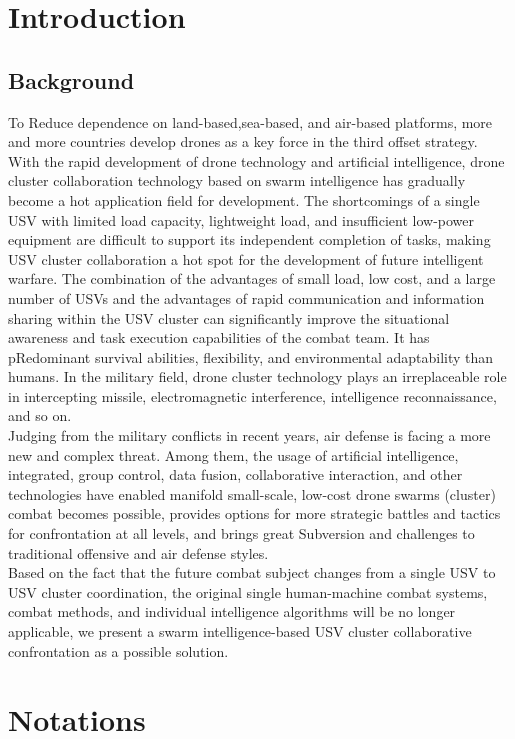 \documentclass{mcmthesis}
\begin{document}
\section{Introduction}
\subsection{Background}
To Reduce dependence on land-based,sea-based, and air-based platforms, more and more countries develop drones as a key force in the third offset strategy. With the rapid development of drone technology and artificial intelligence, drone cluster collaboration technology based on swarm intelligence has gradually become a hot application field for development. The shortcomings of a single USV with limited load capacity, lightweight load, and insufficient low-power equipment are difficult to support its independent completion of tasks, making USV cluster collaboration a hot spot for the development of future intelligent warfare. The combination of the advantages of small load, low cost, and a large number of USVs and the advantages of rapid communication and information sharing within the USV cluster can significantly improve the situational awareness and task execution capabilities of the combat team. It has pRedominant survival abilities, flexibility, and environmental adaptability than humans. In the military field, drone cluster technology plays an irreplaceable role in intercepting missile, electromagnetic interference, intelligence reconnaissance, and so on.\\
Judging from the military conflicts in recent years, air defense is facing a more new and complex threat. Among them, the usage of artificial intelligence, integrated, group control, data fusion, collaborative interaction, and other technologies have enabled manifold small-scale, low-cost drone swarms (cluster) combat becomes possible, provides options for more strategic battles and tactics for confrontation at all levels, and brings great Subversion and challenges to traditional offensive and air defense styles.\\
Based on the fact that the future combat subject changes from a single USV to USV cluster coordination, the original single human-machine combat systems, combat methods, and individual intelligence algorithms will be no longer applicable, we present a swarm intelligence-based USV cluster collaborative confrontation as a possible solution.


\section{Notations}
\end{document}
